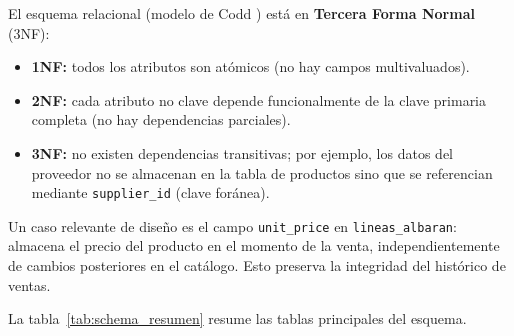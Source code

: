 \documentclass[12pt,twoside,titlepage]{report}
\begin{document}
El esquema relacional (modelo de Codd \cite{codd1970}) está en \textbf{Tercera Forma Normal} (3NF):

\begin{itemize}[nosep]
  \item \textbf{1NF:} todos los atributos son atómicos (no hay campos multivaluados).
  \item \textbf{2NF:} cada atributo no clave depende funcionalmente de la clave primaria completa (no hay dependencias parciales).
  \item \textbf{3NF:} no existen dependencias transitivas; por ejemplo, los datos del proveedor no se almacenan en la tabla de productos sino que se referencian mediante \texttt{supplier\_id} (clave foránea).
\end{itemize}

Un caso relevante de diseño es el campo \texttt{unit\_price} en \texttt{lineas\_albaran}: almacena el precio del producto en el momento de la venta, independientemente de cambios posteriores en el catálogo. Esto preserva la integridad del histórico de ventas.

La tabla~\ref{tab:schema_resumen} resume las tablas principales del esquema.
\end{document}

